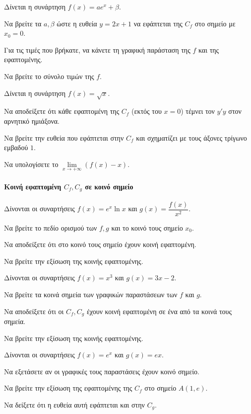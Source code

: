 \documentclass[11pt,a4paper,modern]{FFExercises}
\begin{document}
\askhsh
Δίνεται η συνάρτηση $ f(x)=a e^x + \beta $.
\begin{alist}
    \item Να βρείτε τα $ a, \beta $ ώστε η ευθεία $ y=2x+1 $ να εφάπτεται της $ C_f $ στο σημείο με $ x_0=0 $.
    \item Για τις τιμές που βρήκατε, να κάνετε τη γραφική παράσταση της $ f $ και της εφαπτομένης.
    \item Να βρείτε το σύνολο τιμών της $ f $.
\end{alist}

\askhsh
Δίνεται η συνάρτηση $ f(x)= \sqrt{x} $.
\begin{alist}
    \item Να αποδείξετε ότι κάθε εφαπτομένη της $ C_f $ (εκτός του $ x=0 $) τέμνει τον $ y'y $ στον αρνητικό ημιάξονα.
    \item Να βρείτε την ευθεία που εφάπτεται στην $ C_f $ και σχηματίζει με τους άξονες τρίγωνο εμβαδού $ 1 $.
    \item Να υπολογίσετε το $ \lim\limits_{x\to +\infty} (f(x)-x) $.
\end{alist}

\paragraph{Κοινή εφαπτομένη $ C_f,C_g $ σε κοινό σημείο}
\askhsh
Δίνονται οι συναρτήσεις $ f(x)=e^x \ln x $ και $ g(x)=\dfrac{f(x)}{x^2} $.
\begin{alist}
    \item Να βρείτε το πεδίο ορισμού των $ f,g $ και το κοινό τους σημείο $ x_0 $.
    \item Να αποδείξετε ότι στο κοινό τους σημείο έχουν κοινή εφαπτομένη.
    \item Να βρείτε την εξίσωση της κοινής εφαπτομένης.
\end{alist}

\askhsh
Δίνονται οι συναρτήσεις $ f(x)=x^3 $ και $ g(x)=3x-2 $.
\begin{alist}
    \item Να βρείτε τα κοινά σημεία των γραφικών παραστάσεων των $ f $ και $ g $.
    \item Να αποδείξετε ότι οι $ C_f, C_g $ έχουν κοινή εφαπτομένη σε ένα από τα κοινά τους σημεία.
    \item Να βρείτε την εξίσωση της κοινής εφαπτομένης.
\end{alist}

\askhsh
Δίνονται οι συναρτήσεις $ f(x)=e^x $ και $ g(x)=e x $.
\begin{alist}
    \item Να εξετάσετε αν οι γραφικές τους παραστάσεις έχουν κοινό σημείο.
    \item Να βρείτε την εξίσωση της εφαπτομένης της $ C_f $ στο σημείο $ A(1,e) $.
    \item Να δείξετε ότι η ευθεία αυτή εφάπτεται και στην $ C_g $.
\end{alist}
\end{document}

